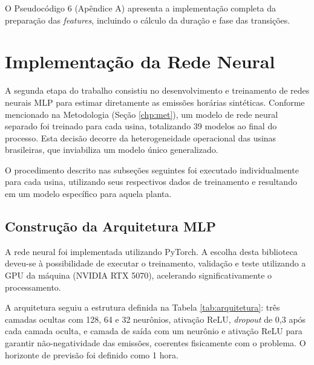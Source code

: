 O Pseudocódigo 6 (Apêndice A) apresenta a implementação completa da preparação das \textit{features}, incluindo o cálculo da duração e fase das transições.

\section{Implementação da Rede Neural}

A segunda etapa do trabalho consistiu no desenvolvimento e treinamento de redes neurais \ac{MLP} para estimar diretamente as emissões horárias sintéticas. Conforme mencionado na Metodologia (Seção \ref{chp:met}), um modelo de rede neural separado foi treinado para cada usina, totalizando 39 modelos ao final do processo. Esta decisão decorre da heterogeneidade operacional das usinas brasileiras, que inviabiliza um modelo único generalizado.

O procedimento descrito nas subseções seguintes foi executado individualmente para cada usina, utilizando seus respectivos dados de treinamento e resultando em um modelo específico para aquela planta.

\subsection{Construção da Arquitetura \ac{MLP}}

A rede neural foi implementada utilizando PyTorch. A escolha desta biblioteca deveu-se à possibilidade de executar o treinamento, validação e teste utilizando a GPU da máquina (NVIDIA RTX 5070), acelerando significativamente o processamento.

A arquitetura seguiu a estrutura definida na Tabela \ref{tab:arquitetura}: três camadas ocultas com 128, 64 e 32 neurônios, ativação \ac{ReLU}, \textit{dropout} de 0,3 após cada camada oculta, e camada de saída com um neurônio e ativação \ac{ReLU} para garantir não-negatividade das emissões, coerentes fisicamente com o problema. O horizonte de previsão foi definido como 1 hora.



